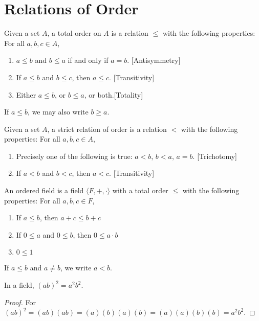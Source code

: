\section{Relations of Order}
    \begin{definition}
        Given a set $A$, a total order on $A$ is a relation $\leq$ with the
        following properties: For all $a,b,c\in A$,
        \begin{enumerate}
            \item   $a\leq b$ and $b\leq a$ if and only if $a=b$.
                    \hfill[Antisymmetry]
            \item   If $a\leq{b}$ and $b\leq c$, then $a\leq{c}$.
                    \hfill[Transitivity]
            \item Either $a\leq b$, or $b\leq a$, or both.\hfill[Totality]
        \end{enumerate}
    \end{definition}
    If $a\leq b$, we may also write $b\geq a$.
    \begin{definition}
        Given a set $A$, a strict relation of order is a relation $<$ with the
        following properties: For all $a,b,c\in A$,
        \begin{enumerate}
            \item   Precisely one of the following is true: $a<b$, $b<a$, $a=b$.
                    \hfill [Trichotomy]
            \item   If $a<b$ and $b<c$, then $a<c$.
                    \hfill[Transitivity]
        \end{enumerate}
    \end{definition}
    \begin{definition}
        An ordered field is a field $\langle F,+,\cdot \rangle$ with a total
        order $\leq$ with the following properties: For all $a,b,c\in F$,
        \begin{enumerate}
            \item   If $a\leq b$, then $a+c\leq b+c$
            \item   If $0 \leq a$ and $0\leq b$, then $0\leq a\cdot b$
            \item   $0\leq 1$
        \end{enumerate}
    \end{definition}
    If $a\leq b$ and $a\ne b$, we write $a<b$.
    \begin{theorem}
        In a field, $(ab)^{2}=a^{2}b^{2}$.
    \end{theorem}
    \begin{proof}
        For $(ab)^{2}=(ab)(ab)=(a)(b)(a)(b)=(a)(a)(b)(b)=a^{2}b^{2}$.
    \end{proof}
